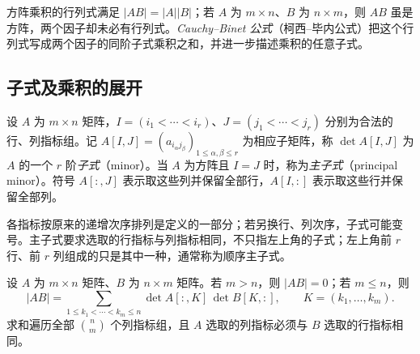 方阵乘积的行列式满足 $|AB|=|A||B|$；若 $A$ 为 $m\times n$、$B$ 为 $n\times m$，则 $AB$ 虽是方阵，两个因子却未必有行列式。\emph{Cauchy--Binet 公式}（柯西--毕内公式）把这个行列式写成两个因子的同阶子式乘积之和，并进一步描述乘积的任意子式。

\subsection{子式及乘积的展开}

\begin{definition}
\label{def:matrix-minors}
设 $A$ 为 $m\times n$ 矩阵，$I=(i_1<\cdots<i_r)$、$J=(j_1<\cdots<j_r)$ 分别为合法的行、列指标组。记 $A[I,J]=(a_{i_\alpha j_\beta})_{1\leq\alpha,\beta\leq r}$ 为相应子矩阵，称 $\det A[I,J]$ 为 $A$ 的一个 $r$ 阶\emph{子式}（minor）。当 $A$ 为方阵且 $I=J$ 时，称为\emph{主子式}（principal minor）。符号 $A[:,J]$ 表示取这些列并保留全部行，$A[I,:]$ 表示取这些行并保留全部列。
\end{definition}

各指标按原来的递增次序排列是定义的一部分；若另换行、列次序，子式可能变号。主子式要求选取的行指标与列指标相同，不只指左上角的子式；左上角前 $r$ 行、前 $r$ 列组成的只是其中一种，通常称为顺序主子式。

\begin{theorem}
\label{thm:matrix-cauchy-binet}
设 $A$ 为 $m\times n$ 矩阵、$B$ 为 $n\times m$ 矩阵。若 $m>n$，则 $|AB|=0$；若 $m\leq n$，则
\begin{equation}
\label{eq:matrix-cauchy-binet}
    |AB|=\sum_{1\leq k_1<\cdots<k_m\leq n}
        \det A[:,K]\,\det B[K,:],
    \qquad K=(k_1,\ldots,k_m).
\end{equation}
求和遍历全部 $\binom nm$ 个列指标组，且 $A$ 选取的列指标必须与 $B$ 选取的行指标相同。
\end{theorem}


